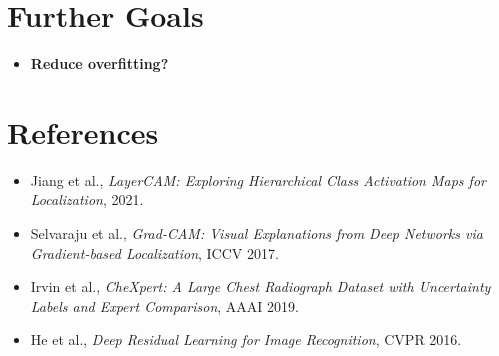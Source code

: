 \documentclass[12pt]{article}
\begin{document}
\section{Further Goals}

\begin{itemize}
    \item \textbf{Reduce overfitting?}
\end{itemize}

\section*{References}

\begin{itemize}[leftmargin=*]
    \item Jiang et al., \textit{LayerCAM: Exploring Hierarchical Class Activation Maps for Localization}, 2021.
    \item Selvaraju et al., \textit{Grad-CAM: Visual Explanations from Deep Networks via Gradient-based Localization}, ICCV 2017.
    \item Irvin et al., \textit{CheXpert: A Large Chest Radiograph Dataset with Uncertainty Labels and Expert Comparison}, AAAI 2019.
    \item He et al., \textit{Deep Residual Learning for Image Recognition}, CVPR 2016.
\end{itemize}
\end{document}
